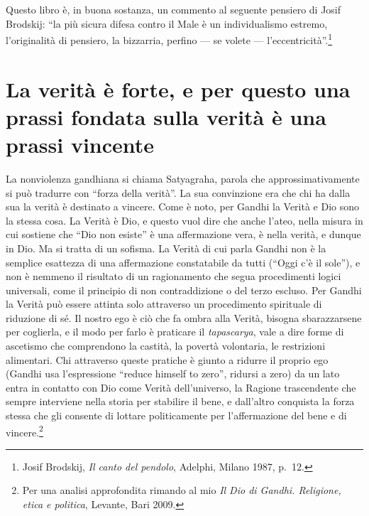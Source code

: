 \documentclass[12pt,oneside,openany]{book}
\begin{document}
Questo libro è, in buona sostanza, un commento al seguente pensiero di Josif Brodskij: ``la più sicura difesa contro il Male è un individualismo estremo, l'originalità di pensiero, la bizzarria, perfino --- se volete --- l'eccentricità''.\footnote{Josif Brodskij, \emph{Il canto del pendolo}, Adelphi, Milano 1987, p.~12.}

\setcounter{chapter}{1}\addtocounter{chapter}{-1}

\chapter{La verità è forte, e per questo una prassi fondata sulla verità è una prassi vincente}

La nonviolenza gandhiana si chiama Satyagraha, parola che approssimativamente si può tradurre con ``forza della verità''. La sua convinzione era che chi ha dalla sua la verità è destinato a vincere. Come è noto, per Gandhi la Verità e Dio sono la stessa cosa. La Verità è Dio, e questo vuol dire che anche l'ateo, nella misura in cui sostiene che ``Dio non esiste'' è una affermazione vera, è nella verità, e dunque in Dio. Ma si tratta di un sofisma. La Verità di cui parla Gandhi non è la semplice esattezza di una affermazione constatabile da tutti (``Oggi c'è il sole''), e non è nemmeno il risultato di un ragionamento che segua procedimenti logici universali, come il principio di non contraddizione o del terzo escluso. Per Gandhi la Verità può essere attinta solo attraverso un procedimento spirituale di riduzione di sé. Il nostro ego è ciò che fa ombra alla Verità, bisogna sbarazzarsene per coglierla, e il modo per farlo è praticare il \emph{tapascarya}, vale a dire forme di ascetismo che comprendono la castità, la povertà volontaria, le restrizioni alimentari. Chi attraverso queste pratiche è giunto a ridurre il proprio ego (Gandhi usa l'espressione ``reduce himself to zero'', ridursi a zero) da un lato entra in contatto con Dio come Verità dell'universo, la Ragione trascendente che sempre interviene nella storia per stabilire il bene, e dall'altro conquista la forza stessa che gli consente di lottare politicamente per l'affermazione del bene e di vincere.\footnote{Per una analisi approfondita rimando al mio \emph{Il Dio di Gandhi. Religione, etica e politica}, Levante, Bari 2009.}
\end{document}
